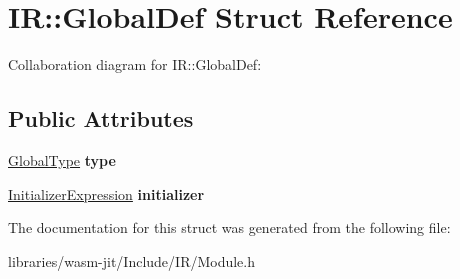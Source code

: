 \hypertarget{struct_i_r_1_1_global_def}{}\section{IR\+:\+:Global\+Def Struct Reference}
\label{struct_i_r_1_1_global_def}


Collaboration diagram for IR\+:\+:Global\+Def\+:
\subsection*{Public Attributes}
\begin{DoxyCompactItemize}
\item 
\mbox{\label{struct_i_r_1_1_global_def_a28256cfc197746f5e4cbb737882f95cc}} 
\mbox{\hyperlink{struct_i_r_1_1_global_type}{Global\+Type}} {\bfseries type}
\item 
\mbox{\label{struct_i_r_1_1_global_def_aab92ad5bed304451c71026d9e2712aca}} 
\mbox{\hyperlink{struct_i_r_1_1_initializer_expression}{Initializer\+Expression}} {\bfseries initializer}
\end{DoxyCompactItemize}


The documentation for this struct was generated from the following file\+:\begin{DoxyCompactItemize}
\item 
libraries/wasm-\/jit/\+Include/\+I\+R/Module.\+h\end{DoxyCompactItemize}
